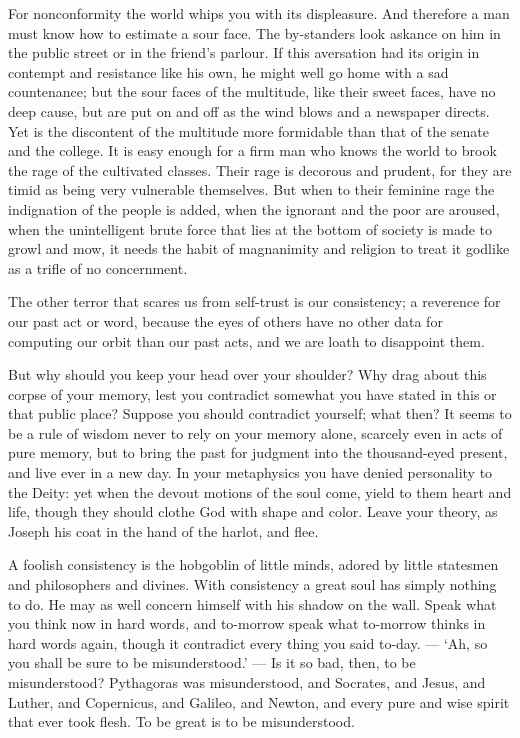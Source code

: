 \documentclass{article}
\begin{document}
For nonconformity the world whips you with its displeasure. And therefore a
man must know how to estimate a sour face. The by-standers look askance on
him in the public street or in the friend's parlour. If this aversation had
its origin in contempt and resistance like his own, he might well go home
with a sad countenance; but the sour faces of the multitude, like their
sweet faces, have no deep cause, but are put on and off as the wind blows
and a newspaper directs. Yet is the discontent of the multitude more
formidable than that of the senate and the college. It is easy enough for a
firm man who knows the world to brook the rage of the cultivated classes.
Their rage is decorous and prudent, for they are timid as being very
vulnerable themselves. But when to their feminine rage the indignation of
the people is added, when the ignorant and the poor are aroused, when the
unintelligent brute force that lies at the bottom of society is made to
growl and mow, it needs the habit of magnanimity and religion to treat it
godlike as a trifle of no concernment.

The other terror that scares us from self-trust is our consistency; a
reverence for our past act or word, because the eyes of others have no other
data for computing our orbit than our past acts, and we are loath to
disappoint them.

But why should you keep your head over your shoulder? Why drag about this
corpse of your memory, lest you contradict somewhat you have stated in this
or that public place? Suppose you should contradict yourself; what then? It
seems to be a rule of wisdom never to rely on your memory alone, scarcely
even in acts of pure memory, but to bring the past for judgment into the
thousand-eyed present, and live ever in a new day. In your metaphysics you
have denied personality to the Deity: yet when the devout motions of the
soul come, yield to them heart and life, though they should clothe God with
shape and color. Leave your theory, as Joseph his coat in the hand of the
harlot, and flee.

A foolish consistency is the hobgoblin of little minds, adored by little
statesmen and philosophers and divines. With consistency a great soul has
simply nothing to do. He may as well concern himself with his shadow on the
wall. Speak what you think now in hard words, and to-morrow speak what
to-morrow thinks in hard words again, though it contradict every thing you
said to-day. --- `Ah, so you shall be sure to be misunderstood.' --- Is it so
bad, then, to be misunderstood? Pythagoras was misunderstood, and Socrates,
and Jesus, and Luther, and Copernicus, and Galileo, and Newton, and every
pure and wise spirit that ever took flesh. To be great is to be
misunderstood.
\end{document}
